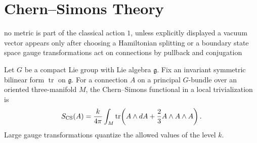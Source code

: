 \chapter{Chern--Simons Theory}
\label{ch:tqft-chern-simons-theory}

{no metric is part of the classical action}
{\(1\), unless explicitly displayed}
{a vacuum vector appears only after choosing a Hamiltonian splitting or a
boundary state space}
{gauge transformations act on connections by pullback and conjugation}

Let \(G\) be a compact Lie group with Lie algebra \(\mathfrak g\).  Fix an
invariant symmetric bilinear form \(\operatorname{tr}\) on \(\mathfrak g\).
For a connection \(A\) on a principal \(G\)-bundle over an oriented
three-manifold \(M\), the Chern--Simons functional in a local trivialization is
\[
  S_{\rm CS}(A)
  =
  \frac{k}{4\pi}\int_M
  \operatorname{tr}\!\left(A\wedge dA+\frac23 A\wedge A\wedge A\right).
\]
Large gauge transformations quantize the allowed values of the level \(k\).

